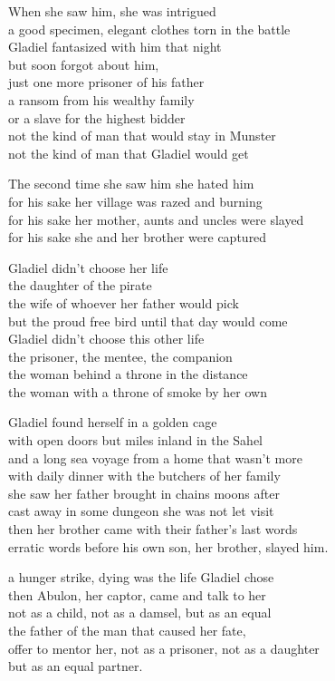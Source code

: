 \begin{lyrics}
When she saw him, she was intrigued\\
a good specimen, elegant clothes torn in the battle\\
Gladiel fantasized with him that night\\
but soon forgot about him,\\
just one more prisoner of his father\\
a ransom from his wealthy family\\
or a slave for the highest bidder\\
not the kind of man that would stay in Munster\\
not the kind of man that Gladiel would get

The second time she saw him she hated him\\
for his sake her village was razed and burning\\
for his sake her mother, aunts and uncles were slayed\\
for his sake she and her brother were captured

Gladiel didn't choose her life\\
the daughter of the pirate\\
the wife of whoever her father would pick\\
but the proud free bird until that day would come\\
Gladiel didn't choose this other life\\
the prisoner, the mentee, the companion\\
the woman behind a throne in the distance\\
the woman with a throne of smoke by her own

Gladiel found herself in a golden cage\\
with open doors but miles inland in the Sahel\\
and a long sea voyage from a home that wasn't more\\
with daily dinner with the butchers of her family\\
she saw her father brought in chains moons after\\
cast away in some dungeon she was not let visit\\
then her brother came with their father's last words\\
erratic words before his own son, her brother, slayed him.

a hunger strike, dying was the life Gladiel chose\\
then Abulon, her captor, came and talk to her\\
not as a child, not as a damsel, but as an equal\\
the father of the man that caused her fate,\\
offer to mentor her, not as a prisoner, not as a daughter\\
but as an equal partner.


\end{lyrics}
